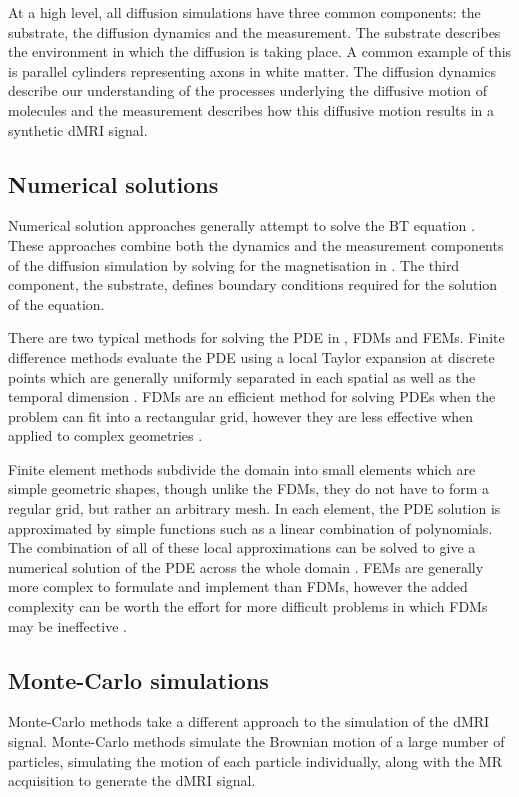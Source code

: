 At a high level, all diffusion simulations have three common components: the substrate, the diffusion dynamics and the measurement.
The substrate describes the environment in which the diffusion is taking place. A common example of this is parallel cylinders representing axons in white matter.
The diffusion dynamics describe our understanding of the processes underlying the diffusive motion of molecules and the measurement describes how this diffusive motion results in a synthetic \ac{dMRI} signal.
\subsection{Numerical solutions}
\label{sec:numerical_solutions}
Numerical solution approaches generally attempt to solve the \acl{BT} equation \cite{Torrey1956}.
These approaches combine both the dynamics and the measurement components of the diffusion simulation by solving for the magnetisation in  .
The third component, the substrate, defines boundary conditions required for the solution of the equation. 

There are two typical methods for solving the \ac{PDE} in , \acp{FDM} and \acp{FEM}.
Finite difference methods evaluate the \ac{PDE} using a local Taylor expansion at discrete points which are generally uniformly separated in each spatial as well as the temporal dimension \cite{Grossmann2007}.
\acp{FDM} are an efficient method for solving \acp{PDE} when the problem can fit into a rectangular grid, however they are less effective when applied to complex geometries \cite{Hagslatt2003, Grossmann2007}.

Finite element methods subdivide the domain into small elements which are simple geometric shapes, though unlike the \acp{FDM}, they do not have to form a regular grid, but rather an arbitrary mesh.
In each element, the \ac{PDE} solution is approximated by simple functions such as a linear combination of polynomials.
The combination of all of these local approximations can be solved to give a numerical solution of the \ac{PDE} across the whole domain \cite{Logan2007}.
\acp{FEM} are generally more complex to formulate and implement than \acp{FDM}, however the added complexity can be worth the effort for more difficult problems in which \acp{FDM} may be ineffective \cite{Iserles2009}.

\subsection{Monte-Carlo simulations}
\label{sec:montecarlo}
Monte-Carlo methods take a different approach to the simulation of the \ac{dMRI} signal. Monte-Carlo methods simulate the Brownian motion of a large number of particles, simulating the motion of each particle individually, along with the MR acquisition to generate the \ac{dMRI} signal.

